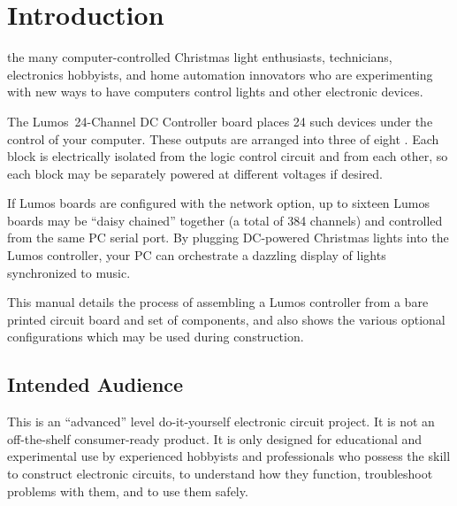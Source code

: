 \documentclass[letterpaper,twoside,onecolumn,openright,final]{memoir}
\begin{document}
\begin{center}
\end{center}

\newpage
\tableofcontents
\listoffigures
\listoftables

\mainmatter

\chapter{Introduction}
 the many computer-controlled
Christmas light enthusiasts,  technicians, electronics hobbyists,
and home automation innovators who are experimenting with new ways to have computers
control lights and other electronic devices.

The Lumos\TM\ 24-Channel DC Controller board places 24 such devices under the control
of your computer.  These outputs are arranged into three  of eight .
Each block is electrically isolated from the logic control circuit and from each other,
so each block may be separately powered at different voltages if desired.

If Lumos boards are configured with the  network option, up to sixteen Lumos
boards may be ``daisy chained'' together (a total of 384 channels) and controlled from 
the same PC serial port.
By plugging DC-powered Christmas lights into the Lumos controller, your PC can orchestrate
a dazzling display of lights synchronized to music.

This manual details the process of assembling a Lumos controller from a bare printed
circuit board and set of components, and also shows the various optional configurations
which may be used during construction.

\section{Intended Audience}
This is an ``advanced'' level do-it-yourself electronic circuit project.  It is not
an off-the-shelf consumer-ready product.  It is only designed for educational and experimental
use by experienced hobbyists and professionals who possess the skill to construct electronic
circuits, to understand how they function, troubleshoot problems with them, and to use them safely.






\end{document}
